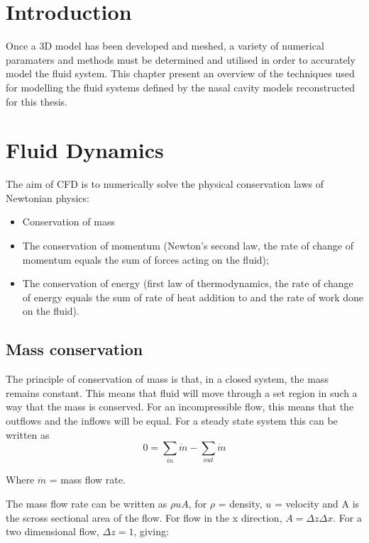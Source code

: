 \section{Introduction}
Once a 3D model has been developed and meshed, a variety of numerical paramaters and methods must be determined and utilised in order to accurately model the fluid system.
 This chapter present an overview of the techniques used for modelling the fluid systems defined by the nasal cavity models reconstructed for this thesis. 


\section{Fluid Dynamics}
The aim of CFD is to numerically solve the physical conservation laws of Newtonian physics:

\begin{itemize}
  \item Conservation of mass

  \item The conservation of momentum (Newton's second law, the rate of change of momentum equals the sum of forces acting on the fluid);

  \item The conservation of energy (first law of thermodynamics, the rate of change of energy equals the sum of rate of heat addition to and the rate of work done on the fluid).
 
\end{itemize}

    \subsection{Mass conservation}

    The principle of conservation of mass is that, in a closed system, the mass remains constant. This means that fluid will move through a set region in such a way that the mass is conserved. For an incompressible flow, this means that the outflows and the inflows will be equal. For a steady state system this can be written as
    \begin{equation} \label{eq:1}
      0 = \sum_{in} \dot{m} - \sum_{out} \dot{m}
    \end{equation} 

    Where $\dot{m}$ = mass flow rate.
    
    The mass flow rate can be written as $ \rho u A $,  for $\rho$ = density, $u$ = velocity and A is the scross sectional area of the flow. For flow in the x direction, $ A = \Delta z \Delta x $. For a two dimensional flow, $ \Delta z = 1 $, giving:

